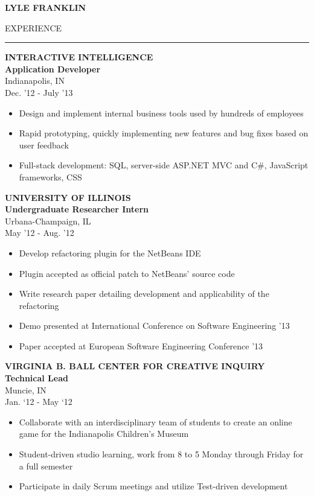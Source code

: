 \documentclass[a4paper,10pt]{article}
\newcommand{\name}[1]{\textbf{\huge{#1}}}
\newcommand{\header}[1]
{
{\Large{\uppercase{#1}}}
\vspace{0.05in}
\hrule
\vspace{0.15in}
}
\newenvironment{details}
{\begin{itemize}[label=\Squarepipe,leftmargin=0.2in]}
{\end{itemize}}
\begin{document}
\name{LYLE FRANKLIN}
\vspace{0.2in}

\begin{minipage}[t]{0.55\textwidth}
\header{Experience}

\textbf{INTERACTIVE INTELLIGENCE\\Application Developer}\\
Indianapolis, IN\\
Dec. '12 - July '13

\begin{details}
  \item Design and implement internal business tools used by hundreds of employees
  \item Rapid prototyping, quickly implementing new features and bug fixes based on user feedback
  \item Full-stack development: SQL, server-side ASP.NET MVC and C\#, JavaScript frameworks, CSS
\end{details}


\textbf{UNIVERSITY OF ILLINOIS\\Undergraduate Researcher Intern}\\
Urbana-Champaign, IL\\
May '12 - Aug. '12

\begin{details}
  \item Develop refactoring plugin for the NetBeans IDE
  \item Plugin accepted as official patch to NetBeans’ source code
  \item Write research paper detailing development and applicability of the refactoring
  \item Demo presented at International Conference on Software Engineering '13
  \item Paper accepted at European Software Engineering Conference '13
\end{details}

\textbf{VIRGINIA B. BALL CENTER FOR CREATIVE INQUIRY\\Technical Lead}\\
Muncie, IN\\
Jan. ‘12 - May ‘12

\begin{details}
  \item Collaborate with an interdisciplinary team of students to create
an online game for the Indianapolis Children’s Museum
  \item Student-driven studio learning, work from 8 to 5 Monday
through Friday for a full semester
  \item Participate in daily Scrum meetings and utilize Test-driven
development
\end{details}


\end{minipage}
\end{document}
